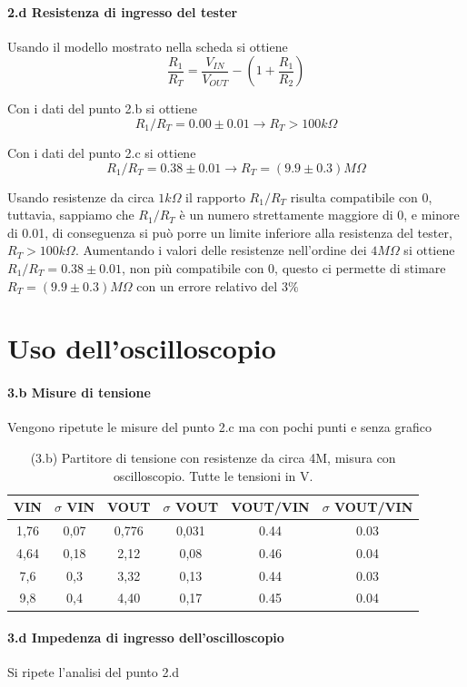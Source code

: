\documentclass[10pt,a4paper]{article}
\begin{document}
\paragraph{2.d Resistenza di ingresso del tester}
Usando il modello mostrato nella scheda si ottiene
\[ \frac{R_1}{R_T} =  \frac{V_{IN}}{V_{OUT}} - (1 +  \frac{R_1}{R_2} )
\]

Con i dati del punto 2.b si ottiene
\[ R_1/R_T = 0.00  \pm  0.01   \rightarrow  R_T > 100 k\Omega
\]


Con i dati del punto 2.c si ottiene
\[ R_1/R_T = 0.38  \pm  0.01   \rightarrow  R_T = ( 9.9\pm  0.3)  M\Omega
\]

Usando resistenze da circa $1 k\Omega$ il rapporto $R_1/R_T$ risulta compatibile con 0, tuttavia, sappiamo che $R_1/R_T$ è un numero strettamente maggiore di 0, e minore di 0.01, di conseguenza si può porre un limite inferiore alla resistenza del tester, $R_T>100 k\Omega$. Aumentando i valori delle resistenze nell'ordine dei $4M\Omega$ si ottiene $R_1/R_T = 0.38  \pm  0.01$, non più compatibile con 0, questo ci permette di stimare $R_T=( 9.9\pm  0.3)  M\Omega$  con un errore relativo del $3\%$


\section{Uso dell'oscilloscopio}

\paragraph{3.b Misure di tensione} 
Vengono ripetute le misure del punto 2.c  ma con pochi punti e senza grafico
\begin{table}[h]
\centering
\begin{tabular}{|c|c|c|c|c|c|}
\hline 
VIN& $\sigma$ VIN  &VOUT	 & $\sigma$ VOUT& VOUT/VIN & $\sigma$ VOUT/VIN \\
\hline 
1,76 & 0,07 & 0,776 & 0,031 & 0.44 & 0.03\\
4,64 & 0,18 & 2,12 & 0,08 & 0.46 & 0.04 \\
7,6 & 0,3 & 3,32 & 0,13 & 0.44 & 0.03 \\
9,8 & 0,4 & 4,40 & 0,17 & 0.45 & 0.04 \\
\hline 
\end{tabular} 
\caption{(3.b) Partitore di tensione con resistenze da circa 4M, misura con oscilloscopio. Tutte le tensioni in V.}
\end{table}


\paragraph{3.d Impedenza di ingresso dell'oscilloscopio} Si ripete l'analisi del punto 2.d
\end{document}
